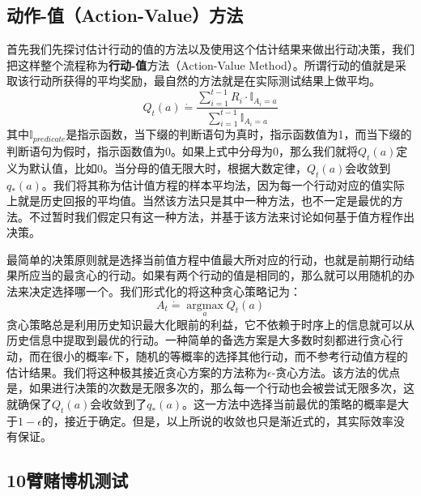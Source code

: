 \documentclass{ctexart}
\begin{document}
        \subsection{动作-值（Action-Value）方法}
            首先我们先探讨估计行动的值的方法以及使用这个估计结果来做出行动决策，我们把这样整个流程称为\textbf{行动-值}方法（Action-Value Method）。所谓行动的值就是采取该行动所获得的平均奖励，最自然的方法就是在实际测试结果上做平均。
            \begin{equation}
                Q_t(a) \dot{=} \frac{\sum_{i=1}^{t-1}R_i \cdot \mathbb{I}_{A_i=a}}{\sum_{i=1}^{t-1}\mathbb{I}_{A_i=a}}
                \label{e_3}
            \end{equation}
            其中$\mathbb{I}_{predicate}$是指示函数，当下缀的判断语句为真时，指示函数值为1，而当下缀的判断语句为假时，指示函数值为0。如果上式中分母为0，那么我们就将$Q_t(a)$定义为默认值，比如0。当分母的值无限大时，根据大数定律，$Q_t(a)$会收敛到$q_{*}(a)$。我们将其称为估计值方程的样本平均法，因为每一个行动对应的值实际上就是历史回报的平均值。当然该方法只是其中一种方法，也不一定是最优的方法。不过暂时我们假定只有这一种方法，并基于该方法来讨论如何基于值方程作出决策。

            最简单的决策原则就是选择当前值方程中值最大所对应的行动，也就是前期行动结果所应当的最贪心的行动。如果有两个行动的值是相同的，那么就可以用随机的办法来决定选择哪一个。我们形式化的将这种贪心策略记为：
            \begin{equation}
                A_t \dot{=} \operatorname*{argmax}\limits_{a} Q_t(a)
                \label{e_4}
            \end{equation}
            贪心策略总是利用历史知识最大化眼前的利益，它不依赖于时序上的信息就可以从历史信息中提取到最优的行动。一种简单的备选方案是大多数时刻都进行贪心行动，而在很小的概率$\epsilon$下，随机的等概率的选择其他行动，而不参考行动值方程的估计结果。我们将这种极其接近贪心方案的方法称为$\epsilon$-贪心方法。该方法的优点是，如果进行决策的次数是无限多次的，那么每一个行动也会被尝试无限多次，这就确保了$Q_t(a)$会收敛到了$q_*(a)$。这一方法中选择当前最优的策略的概率是大于$1-\epsilon$的，接近于确定。但是，以上所说的收敛也只是渐近式的，其实际效率没有保证。

        \subsection{10臂赌博机测试}
\end{document}
